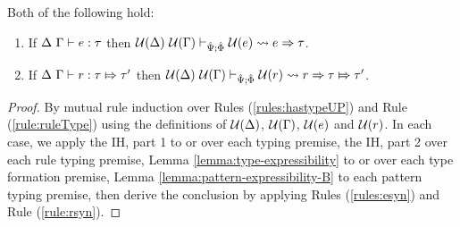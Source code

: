 \begin{theorem}[Expressibility] Both of the following hold:
\begin{enumerate}
\item If $\Delta~\Gamma \vdash e : \tau$ then $\mathcal{U}(\Delta)~\mathcal{U}(\Gamma) \vdash_{\hat{\Psi}; \hat\Phi} \mathcal{U}(e) \leadsto e \Rightarrow \tau$.
\item If $\Delta~\Gamma \vdash r : \tau \Mapsto \tau'$ then $\mathcal{U}(\Delta)~\mathcal{U}(\Gamma) \vdash_{\hat{\Psi}; \hat\Phi} \mathcal{U}(r) \leadsto r \Rightarrow \tau \Mapsto \tau'$.
\end{enumerate}
\end{theorem}
\begin{proof} By mutual rule induction over Rules (\ref{rules:hastypeUP}) and Rule (\ref{rule:ruleType}) using the definitions of $\mathcal{U}(\Delta)$, $\mathcal{U}(\Gamma)$, $\mathcal{U}(e)$ and $\mathcal{U}(r)$. In each case, we apply the IH, part 1 to or over each typing premise, the IH, part 2 over each rule typing premise, Lemma \ref{lemma:type-expressibility} to or over each type formation premise, Lemma \ref{lemma:pattern-expressibility-B} to each pattern typing premise, then derive the conclusion by applying Rules (\ref{rules:esyn}) and Rule (\ref{rule:rsyn}).  
\end{proof} 


